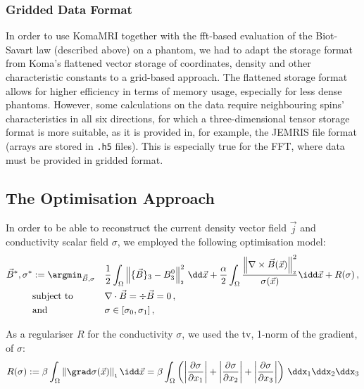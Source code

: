 \documentclass[10pt]{article}
\newcommand{\onenorm}[1]{\left\lVert#1\right\rVert_{\scriptscriptstyle 1}}
\renewcommand{\norm}[1]{\left\lVert#1\right\rVert_{\scriptscriptstyle 2}}
\begin{document}
  \subsubsection{Gridded Data Format}
  In order to use KomaMRI together with the \gls{fft}-based evaluation of the Biot-Savart law (described above) on a phantom, we had to adapt the storage format from Koma's flattened vector storage of coordinates, density and other characteristic constants to a grid-based approach.
  The flattened storage format allows for higher efficiency in terms of memory usage, especially for less dense phantoms.
  However, some calculations on the data require neighbouring spins' characteristics in all six directions, for which a three-dimensional tensor storage format is more suitable, as it is provided in, for example, the JEMRIS file format (arrays are stored in \texttt{.h5} files).
  This is especially true for the FFT, where data must be provided in gridded format.

  \subsection{The Optimisation Approach}
  \label{sec:optimisation-procedure}
  In order to be able to reconstruct the current density vector field $\vec{j}$ and conductivity scalar field $\sigma$, we employed the following optimisation model:
  \begin{align*}
    \vec{B}^*, \sigma^* & := \argmin_{\vec{B}, \sigma} &  & \frac{1}{2} \int_\Omega \norm{\{\vec{B}\}_3 - B_3^0}^2 \,\dd\vec{x} + \frac{\alpha}{2} \int_\Omega \frac{\norm{\nabla \times \vec{B}(\vec{x})}^2}{\sigma(\vec{x})} \idd\vec{x} + R(\sigma)\,, \\
                        & \text{subject to}            &  & \nabla \cdot \vec{B} = \div \vec{B} = 0\,,                                                                                                                                                    \\
                        & \text{and}                   &  & \sigma \in [\sigma_0, \sigma_1]\,,
  \end{align*}

  As a regulariser $R$ for the conductivity $\sigma$, we used the \gls{tv}, 1-norm of the gradient, of $\sigma$:
  $$R(\sigma) := \beta \int_\Omega \onenorm{\grad \sigma(\vec{x})} \idd\vec{x} = \beta \int_\Omega \left(\left|\frac{\partial \sigma}{\partial x_1}\right| + \left|\frac{\partial \sigma}{\partial x_2}\right| + \left|\frac{\partial \sigma}{\partial x_3}\right|\right) \,\ddx_1\ddx_2\ddx_3$$
\end{document}

